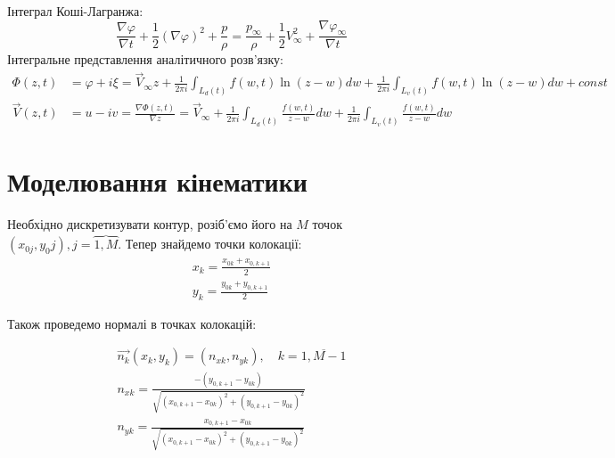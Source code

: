 \documentclass[a4paper,12pt]{article}
\begin{document}
	Інтеграл Коші-Лагранжа:
	\[
	\frac{\nabla \varphi}{\nabla t} + \frac{1}{2}\left( \nabla \varphi \right)^2 + \frac{p}{\rho} = \frac{p_{\infty}}{\rho} + \frac{1}{2} V_{\infty}^2 + \frac{\nabla \varphi_{\infty}}{\nabla t}
	\]
	Інтегральне представлення аналітичного розв'язку:
	\begin{align}
		\Phi(z,t) &= \varphi + i\xi = \vec{V}_\infty z + \frac{1}{2 \pi i} \int_{L_d(t)} f(w,t) \ln{(z - w)}dw + \frac{1}{2 \pi i} \int_{L_v(t)} f(w,t) \ln{(z - w)}dw + const \nonumber \\
		\vec{V}(z,t) &= u- iv = \frac{\nabla \Phi(z,t)}{\nabla z} = \vec{V}_\infty + \frac{1}{2 \pi i} \int_{L_d(t)} \frac{f(w,t)}{z - w} dw + \frac{1}{2 \pi i} \int_{L_v(t)} \frac{f(w,t)}{z - w} dw \nonumber
	\end{align}
\section{Моделювання кінематики}

	Необхідно дискретизувати контур, розіб'ємо його на $M$ точок $(x_{0j}, y_0j), j = \overbrace{1,M}$. Тепер знайдемо точки колокації:
	\begin{eqnarray}
		x_k = \frac{x_{0k} + x_{0, k+1}}{2} \nonumber \\
		y_k = \frac{y_{0k} + y_{0, k+1}}{2} \nonumber
	\end{eqnarray}
	
	Також проведемо нормалі в точках колокацій:
	
	\begin{align} 
		\overrightarrow{n_k} (x_k, y_k) = (n_{xk}, n_{yk}),\quad  k = \overline{1, M-1} \nonumber \\
		n_{xk} = \frac{-(y_{0,k+1} - y_{0k})}{\sqrt{(x_{0, k+1} -  x_{0k})^2 + (y_{0,k+1} - y_{0k})^2}} \nonumber \\
		n_{yk} = \frac{x_{0, k+1} -  x_{0k}}{\sqrt{(x_{0, k+1} -  x_{0k})^2 + (y_{0,k+1} - y_{0k})^2}} \nonumber
	\end{align}
	
\end{document}
